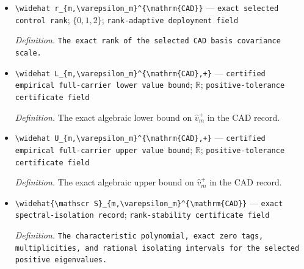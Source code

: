 \documentclass{article}
\begin{document}
\begin{itemize}
  \par\smallskip\noindent\emph{Definition.} The infimum of \(\widehat w_m^+(B)\) over \(\mathcal B_Z^+\).
  \item \texttt{\textbackslash{}\allowbreak{}widehat r\_\allowbreak{}\{m,\allowbreak{}\textbackslash{}\allowbreak{}varepsilon\_\allowbreak{}m\}\allowbreak{}\textasciicircum{}\{\textbackslash{}\allowbreak{}mathrm\{CAD\}\allowbreak{}\}\allowbreak{}} --- \texttt{exact selected control rank}; \(\{0,1,2\}\); \texttt{rank-\allowbreak{}adaptive deployment field}
  \par\smallskip\noindent\emph{Definition.} \texttt{The exact rank of the selected CAD basis covariance scale.}
  \item \texttt{\textbackslash{}\allowbreak{}widehat L\_\allowbreak{}\{m,\allowbreak{}\textbackslash{}\allowbreak{}varepsilon\_\allowbreak{}m\}\allowbreak{}\textasciicircum{}\{\textbackslash{}\allowbreak{}mathrm\{CAD\}\allowbreak{},\allowbreak{}+\allowbreak{}\}\allowbreak{}} --- \texttt{certified empirical full-\allowbreak{}carrier lower value bound}; \(\mathbb R\); \texttt{positive-\allowbreak{}tolerance certificate field}
  \par\smallskip\noindent\emph{Definition.} The exact algebraic lower bound on \(\widehat v_m^+\) in the CAD record.
  \item \texttt{\textbackslash{}\allowbreak{}widehat U\_\allowbreak{}\{m,\allowbreak{}\textbackslash{}\allowbreak{}varepsilon\_\allowbreak{}m\}\allowbreak{}\textasciicircum{}\{\textbackslash{}\allowbreak{}mathrm\{CAD\}\allowbreak{},\allowbreak{}+\allowbreak{}\}\allowbreak{}} --- \texttt{certified empirical full-\allowbreak{}carrier upper value bound}; \(\mathbb R\); \texttt{positive-\allowbreak{}tolerance certificate field}
  \par\smallskip\noindent\emph{Definition.} The exact algebraic upper bound on \(\widehat v_m^+\) in the CAD record.
  \item \texttt{\textbackslash{}\allowbreak{}widehat\{\textbackslash{}\allowbreak{}mathscr S\}\allowbreak{}\_\allowbreak{}\{m,\allowbreak{}\textbackslash{}\allowbreak{}varepsilon\_\allowbreak{}m\}\allowbreak{}\textasciicircum{}\{\textbackslash{}\allowbreak{}mathrm\{CAD\}\allowbreak{}\}\allowbreak{}} --- \texttt{exact spectral-\allowbreak{}isolation record}; \texttt{rank-\allowbreak{}stability certificate field}
  \par\smallskip\noindent\emph{Definition.} \texttt{The characteristic polynomial,\allowbreak{} exact zero tags,\allowbreak{} multiplicities,\allowbreak{} and rational isolating intervals for the selected positive eigenvalues.}

\end{itemize}
\end{document}
